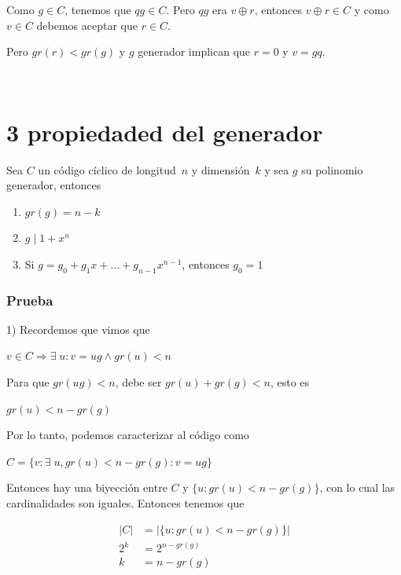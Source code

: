 \documentclass[10pt,a4paper]{article}
\begin{document}
Como $g \in C$, tenemos que $qg \in C$. Pero $qg$ era $v \oplus r$, entonces $v\oplus r \in C$ y como $v \in C$ debemos aceptar que $r \in C$.

Pero $gr(r) < gr(g)$ y $g$ generador implican que $r = 0$ y $v = gq$.

 

\section*{3 propiedaded del generador}

Sea $C$ un código cíclico de longitud $n$ y dimensión $k$ y sea $g$ su polinomio generador, entonces

\begin{enumerate}

	\item $gr(g) = n - k$
	\item $g\;\lvert\; 1 + x^n$
	\item Si $g = g_0 + g_1x + \dots + g_{n-1}x^ {n-1}$, entonces $g_0 = 1$
\end{enumerate}

\subsubsection*{Prueba}

1) Recordemos que vimos que

\begin{center}
$v \in C \Rightarrow \exists \; u : v = ug \land gr(u) <n$
\end{center}

Para que $gr(ug) <n$, debe ser $gr(u) + gr(g) < n$, esto es

\begin{center}
$gr(u) < n - gr(g)$
\end{center}

Por lo tanto, podemos caracterizar al código como

\begin{center}
$C = \{v : \exists\;u, gr(u) < n - gr(g): v = ug\}$
\end{center}

Entonces hay una biyección entre $C$ y $\{u: gr(u) < n-gr(g)\}$, con lo cual las cardinalidades son iguales. Entonces tenemos que

\begin{center}
\begin{align*} |C| &= |\{u:gr(u) < n - gr(g)\}|\\ 2^k &= 2^{n - gr(g)}\\ k &= n - gr(g) \end{align*}
\end{center}
\end{document}
